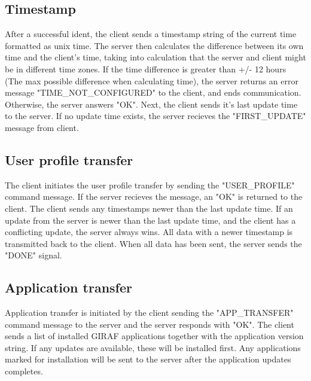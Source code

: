 \subsection{Timestamp}
After a successful ident, the client sends a timestamp string of the current time formatted as unix time. The server then calculates the difference between its own time and the client's time, taking into calculation that the server and client might be in different time zones. If the time difference is greater than +/- 12 hours (The max possible difference when calculating time), the server returns an error message "TIME\_NOT\_CONFIGURED" to the client, and ends communication. Otherwise, the server answers "OK". 
Next, the client sends it's last update time to the server. If no update time exists, the server recieves the "FIRST\_UPDATE" message from client.

\subsection{User profile transfer}
The client initiates the user profile transfer  by sending the "USER\_PROFILE" command message. If the server recieves the message, an "OK" is returned to the client. The client sends any timestamps newer than the last update time. If an update from the server is newer than the last update time, and the client has a conflicting update, the server always wins. All data with a newer timestamp is transmitted back to the client. When all data has been sent, the server sends the "DONE" signal. 

\subsection{Application transfer}
Application transfer is initiated by the client sending the "APP\_TRANSFER" command message to the server and the server responds with "OK". The client sends a list of installed GIRAF applications together with the application version string. If any updates are available, these will be installed first. Any applications marked for installation will be sent to the server after the application updates completes.   

